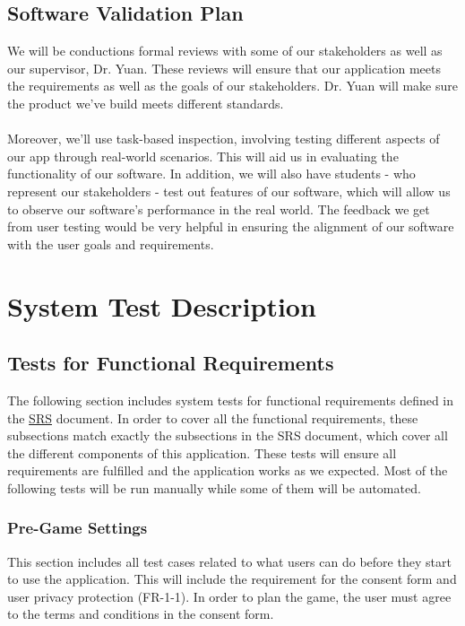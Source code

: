 \documentclass[12pt, titlepage]{article}
\begin{document}
\subsection{Software Validation Plan}

      We will be conductions formal reviews with some of our stakeholders as well as our supervisor, Dr. Yuan. These reviews will ensure that our application meets the requirements as well as the goals of our stakeholders. Dr. Yuan will make sure the product we've build meets different standards.\\\\
      Moreover, we'll use task-based inspection, involving testing different aspects of our app through real-world scenarios. This will aid us in evaluating the functionality of our software. In addition, we will also have students - who represent our stakeholders - test out features of our software, which will allow us to observe our software's performance in the real world. The feedback we get from user testing would be very helpful in ensuring the alignment of our software with the user goals and requirements.    

\section{System Test Description}
\label{sec:system}
	
\subsection{Tests for Functional Requirements}

The following section includes system tests for functional requirements defined in the \href{https://github.com/beatlepie/4G06CapstoneProjectTeam2/blob/main/docs/SRS-Volere/SRS.pdf}{SRS} document. In order to cover all the functional requirements, these subsections match exactly the subsections in the SRS document, which cover all the different components of this application. These tests will ensure all requirements are fulfilled and the application works as we expected. Most of the following tests will be run manually while some of them will be automated.

\subsubsection{Pre-Game Settings}

This section includes all test cases related to what users can do before they start to use the application. This will include the requirement for the consent form and user privacy protection (FR-1-1). In order to plan the game, the user must agree to the terms and conditions in the consent form.
\end{document}
